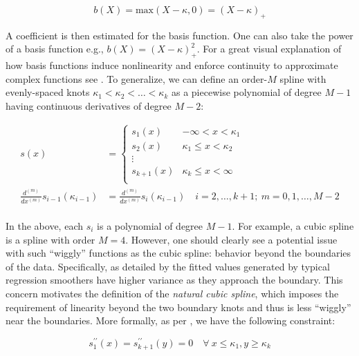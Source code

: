 \documentclass{report}
\begin{document}
\begin{equation}\label{eq:glm-gam-hinge-function}
    b(X) = \text{max}(X - \kappa, 0) = (X - \kappa)_+
\end{equation}

A coefficient is then estimated for the basis function. One can also take the power of a basis function e.g., $b(X) = (X - \kappa)_+^2$. For a great visual explanation of how basis functions induce nonlinearity and enforce continuity to approximate complex functions see \cite[Lecture~6]{molstad_sta_2022}. To generalize, we can define an order-$M$ spline with evenly-spaced knots $\kappa_1 < \kappa_2 < \dots < \kappa_k$ as a piecewise polynomial of degree $M-1$ having continuous derivatives of degree $M-2$:

\begin{equation}\label{eq:glm-gam-order-m-spline}
    \begin{aligned}
        s(x) &= \begin{cases}
            s_1(x) & -\infty < x < \kappa_1 \\
            s_2(x) & \kappa_1 \le x < \kappa_2 \\
            \vdots & \\
            s_{k+1}(x) & \kappa_k \le x < \infty \\
        \end{cases} \\
        \frac{d^{(m)}}{dx^{(m)}} s_{i-1}(\kappa_{i-1}) &= \frac{d^{(m)}}{dx^{(m)}} s_i(\kappa_{i-1}) \quad i = 2, \dots, k+1; \: m = 0, 1, \dots, M-2 \\
    \end{aligned}
\end{equation}

In the above, each $s_i$ is a polynomial of degree $M-1$. For example, a cubic spline is a spline with order $M=4$. However, one should clearly see a potential issue with such ``wiggly'' functions as the cubic spline: behavior beyond the boundaries of the data. Specifically, as detailed by \cite[Chapter~2.9]{hastie_generalized_1990} the fitted values generated by typical regression smoothers have higher variance as they approach the boundary. This concern motivates the definition of the \textit{natural cubic spline}, which imposes the requirement of linearity beyond the two boundary knots and thus is less ``wiggly'' near the boundaries. More formally, as per \cite[Lecture~7]{molstad_sta_2022}, we have the following constraint:

\begin{equation}\label{eq:glm-gam-linearity-constraint}
    s_1^{\prime\prime}(x) = s_{k+1}^{\prime\prime}(y) = 0 \quad \forall \: x \le \kappa_1, y \ge \kappa_k
\end{equation}
\end{document}
